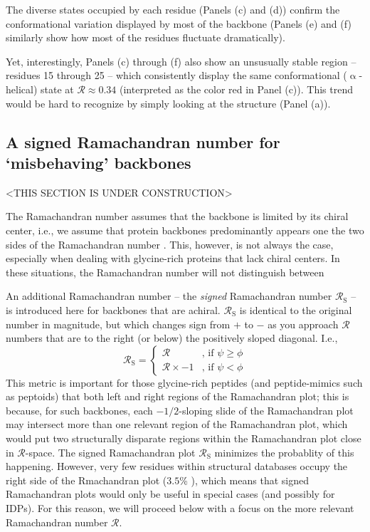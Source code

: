 \documentclass[fleqn,10pt,lineno]{wlpeerj} %
\begin{document}
The diverse states occupied by each residue (Panels (c) and (d)) confirm the conformational variation displayed by most of the backbone (Panels (e) and (f) similarly show how most of the residues fluctuate dramatically).

Yet, interestingly, Panels (c) through (f) also show an unsusually stable region -- residues 15 through 25 -- which consistently display the same conformational ($\upalpha$-helical) state at $\mathcal{R}\approx0.34$ (interpreted as the color red in Panel (c)). This trend would be hard to recognize by simply looking at the structure (Panel (a)). 

\subsection*{A signed Ramachandran number for `misbehaving' backbones}

<THIS SECTION IS UNDER CONSTRUCTION>

The Ramachandran number assumes that the backbone is limited by its chiral center, i.e., we assume that protein backbones predominantly appears one the two sides of the Ramachandran number \cite{Mannige2017}. This, however, is not always the case, especially when dealing with glycine-rich proteins that lack chiral centers. In these situations, the Ramachandran number will not distinguish between


An additional Ramachandran number -- the \textit{signed} Ramachandran number $\mathcal{R}_\textrm{S}$ -- is introduced here for backbones that are achiral. $\mathcal{R}_\textrm{S}$ is identical to the original number in magnitude, but which changes sign from $+$ to $-$ as you approach $\mathcal{R}$ numbers that are to the right (or below) the positively sloped diagonal. I.e., 
\begin{equation}
\mathcal{R}_\textrm{S} = 
\begin{cases}
    \mathcal{R}         &\text{, if } \psi \geq \phi  \\
    \mathcal{R}\times-1 &\text{, if } \psi   <  \phi
\end{cases}\label{eqn:signed}
\end{equation}
This metric is important for those glycine-rich peptides (and peptide-mimics such as peptoids) that both left and right regions of the Ramachandran plot; this is because, for such backbones, each $-1/2$-sloping slide of the Ramachandran plot may intersect more than one relevant region of the Ramachandran plot, which would put two structurally disparate regions within the Ramachandran plot close in $\mathcal{R}$-space. The signed Ramachandran plot $\mathcal{R}_\textrm{S}$ minimizes the probablity of this happening. However, very few residues within structural databases occupy the right side of the Rmachandran plot ($3.5$\% ), which means that signed Ramachandran plots would only be useful in  special cases (and possibly for IDPs). For this reason, we will proceed below with a focus on the more relevant Ramachandran number $\mathcal{R}$.
\end{document}
